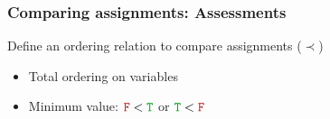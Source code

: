 \documentclass{beamer}
\begin{document}
\begin{frame}
	\frametitle{Comparing assignments: Assessments}
	
	Define an ordering relation to compare assignments ($\prec$)
	\begin{itemize}
		\item Total ordering on variables
		\item Minimum value: $\false < \true$ or $\true < \false$
	\end{itemize}

\vfill
{}

	\vfill


\end{frame}
\end{document}
